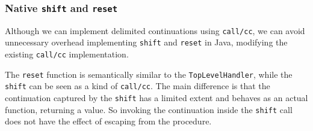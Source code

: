 \documentclass[12pt,a4paper,oneside,openright]{book}
\newenvironment{Shaded}{\begin{snugshade}}{\end{snugshade}}
\newcommand{\KeywordTok}[1]{\textcolor[rgb]{0.13,0.29,0.53}{\textbf{{#1}}}}
\newcommand{\DecValTok}[1]{\textcolor[rgb]{0.00,0.00,0.81}{{#1}}}
\newcommand{\FunctionTok}[1]{\textcolor[rgb]{0.00,0.00,0.00}{{#1}}}
\newcommand{\NormalTok}[1]{{#1}}
\begin{document}
\begin{Shaded}
\end{Shaded}

\subsubsection{\texorpdfstring{Native \texttt{shift} and
\texttt{reset}}{Native shift and reset}}\label{native-shift-and-reset}

Although we can implement delimited continuations using
\texttt{call/cc}, we can avoid unnecessary overhead implementing
\texttt{shift} and \texttt{reset} in Java, modifying the existing
\texttt{call/cc} implementation.

The \texttt{reset} function is semantically similar to the
\texttt{TopLevelHandler}, while the \texttt{shift} can be seen as a kind
of \texttt{call/cc}. The main difference is that the continuation
captured by the \texttt{shift} has a limited extent and behaves as an
actual function, returning a value. So invoking the continuation inside
the \texttt{shift} call does not have the effect of escaping from the
procedure.
\end{document}

